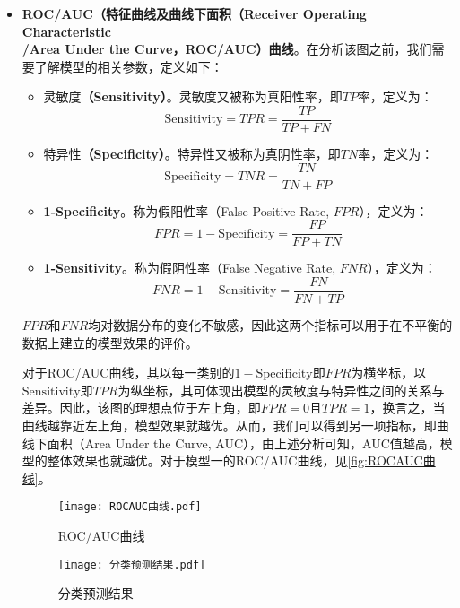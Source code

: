 \documentclass{MathModeling}
\begin{document}
\begin{itemize}
		\item \textbf{ROC/AUC（特征曲线及曲线下面积（Receiver Operating Characteristic\\/Area Under the Curve，ROC/AUC）曲线}。在分析该图之前，我们需要了解模型的相关参数，定义如下：
		\begin{itemize}
			\item {\heiti 灵敏度}\textbf{（Sensitivity）}。灵敏度又被称为真阳性率，即$TP$率，定义为：
			\begin{equation}
				\mathrm{Sensitivity}=TPR=\frac{TP}{TP+FN} \label{Sensitivity}
			\end{equation}
			\item {\heiti 特异性}\textbf{（Specificity）}。特异性又被称为真阴性率，即$TN$率，定义为：
			\begin{equation}
				\mathrm{Specificity}=TNR=\frac{TN}{TN+FP} \label{Specificity}
			\end{equation}
			\item \textbf{1-Specificity}。称为假阳性率（False Positive Rate, $FPR$），定义为：
			\begin{equation}
				FPR=1-\mathrm{Specificity}=\frac{FP}{FP+TN} \label{FPR}
			\end{equation}
			\item \textbf{1-Sensitivity}。称为假阴性率（False Negative Rate, $FNR$），定义为：
			\begin{equation}
				FNR=1-\mathrm{Sensitivity}=\frac{FN}{FN+TP} \label{FNR}
			\end{equation}
		\end{itemize}
		$FPR$和$FNR$均对数据分布的变化不敏感\textcolor{blue}{\cite{procauc}}，因此这两个指标可以用于在不平衡的数据上建立的模型效果的评价。
		
		对于ROC/AUC曲线，其以每一类别的$1-\mathrm{Specificity}$即$FPR$为横坐标，以$\mathrm{Sensitivity}$即$TPR$为纵坐标，其可体现出模型的灵敏度与特异性之间的关系与差异。因此，该图的理想点位于左上角，即$FPR=0$且$TPR=1$，换言之，当曲线越靠近左上角，模型效果就越优。从而，我们可以得到另一项指标，即曲线下面积（Area Under the Curve, AUC），由上述分析可知，AUC值越高，模型的整体效果也就越优。对于模型一的ROC/AUC曲线，见\textcolor{blue}{\cref{fig:ROCAUC曲线}}。

		\begin{figure}[H]
			\centering
			\begin{minipage}{0.48\linewidth}
				\centering
				\texttt{[image: ROCAUC曲线.pdf]}
				\caption{ROC/AUC曲线}
				\label{fig:ROCAUC曲线}
			\end{minipage}
			\begin{minipage}{0.48\linewidth}
				\centering
				\texttt{[image: 分类预测结果.pdf]}
				\caption{分类预测结果}
				\label{fig:分类预测结果}
			\end{minipage}
		\end{figure}


\end{itemize}
\end{document}
